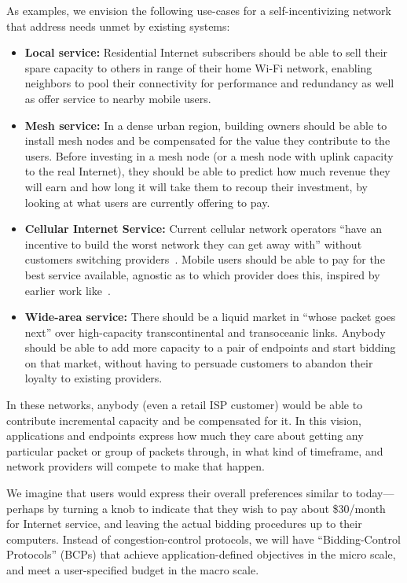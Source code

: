 As examples, we envision the following use-cases for a
self-incentivizing network that address needs unmet by existing systems:

\begin{itemize}
\item \textbf{Local service:}
  Residential Internet subscribers should be able to sell their spare
  capacity to others in range of their home Wi-Fi network,
  enabling neighbors to pool their connectivity for performance and 
  redundancy as well as offer service to nearby mobile users.

\item \textbf{Mesh service:} In a dense urban region, building
  owners should be able to install mesh nodes and be compensated for
  the value they contribute to the users. Before investing in a mesh
  node (or a mesh node with uplink capacity to the real Internet),
  they should be able to predict how much revenue they will earn and
  how long it will take them to recoup their investment, by looking at
  what users are currently offering to pay.

\item \textbf{Cellular Internet Service:} Current cellular network
  operators ``have an incentive to build the worst network they can
  get away with'' without customers switching providers~\cite{economistsignal}.  Mobile users
  should be able to pay for the best service available,
  agnostic as to which provider does this, inspired by earlier work like~\cite{pr02}.

\item \textbf{Wide-area service:} There should be a liquid market in
  ``whose packet goes next'' over high-capacity
  transcontinental and transoceanic links. Anybody should be able to
  add more capacity to a pair of endpoints and start bidding on that
  market, without having to persuade customers to abandon their
  loyalty to existing providers.

\end{itemize}

In these networks, anybody (even a retail ISP customer) would be able
to contribute incremental capacity and be compensated for it. In this
vision, applications and endpoints express how much they care about
getting any particular packet or group of packets through, in what
kind of timeframe, and network providers will compete to make that
happen.

We imagine that users would express their overall preferences similar
to today---perhaps by turning a knob to indicate that they wish to pay about \$30/month
for Internet service, and leaving the actual bidding procedures up to
their computers. Instead of congestion-control protocols, we will have
``Bidding-Control Protocols'' (BCPs) that achieve application-defined objectives in the
micro scale, and meet a user-specified budget in the macro scale.

